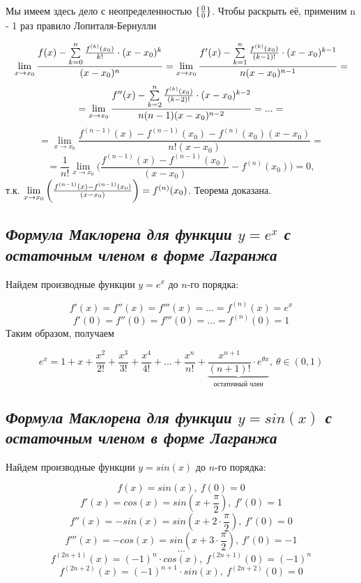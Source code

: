 Мы имеем здесь дело с неопределенностью ${\large\{\frac{0}{0}\}}$. Чтобы раскрыть её, применим n - 1 раз правило Лопиталя-Бернулли

$$\lim\limits_{x \rightarrow x_0}{\frac{f(x) -\sum\limits_{k=0}^n{\Large\frac{f^{(k)}(x_0)}{k!}}\cdot (x - x_0)^k}{(x - x_0)^n}} 
= \lim\limits_{x \rightarrow x_0}\frac{f'(x) -\sum\limits_{k=1}^n{\Large\frac{f^{(k)}(x_0)}{(k-1)!}}\cdot (x - x_0)^{k-1}}{n(x - x_0)^{n-1}} 
=$$ $$= \lim\limits_{x \rightarrow x_0}{\frac{f''(x) -\sum\limits_{k=2}^n{\Large\frac{f^{(k)}(x_0)}{(k-2)!}}\cdot (x - x_0)^{k-2}}{n(n-1)(x - x_0)^{n-2}}} 
= ...=$$ $$
=\lim\limits_{x \rightarrow x_0}{\frac{f^{(n-1)}(x)-f^{(n-1)}(x_0) - f^{(n)}(x_0)(x - x_0)}{n!(x - x_0)}} 
=$$ $$= \frac{1}{n!}\lim\limits_{x \rightarrow x_0}\bigg({\frac{f^{(n-1)}(x)-f^{(n-1)}(x_0)}{(x - x_0)}}- f^{(n)}(x_0)\bigg)=0,$$ т.к. $\lim\limits_{x \rightarrow x_0}\bigg({\Large\frac{f^{(n-1)}(x)-f^{(n-1)}(x_0)}{(x - x_0)}}\bigg)=f^{(n)}(x_0)$. Теорема доказана.
\newpage 
\subsection{\textit{Формула Маклорена для функции $y = e^x$ с остаточным членом в форме Лагранжа}}

Найдем производные функции $y = e^x$ до $n$-го порядка:

$$f'(x) = f''(x) = f'''(x) =...=f^{(n)}(x) = e^x$$ $$f'(0) = f''(0) = f'''(0) =...=f^{(n)}(0) = 1$$ Таким образом, получаем
\begin{mainQuote}

$$e^x = 1 + x + \frac{x^2}{2!}+ \frac{x^3}{3!}+ \frac{x^4}{4!} + ... + \frac{x^n}{n!} + \underbrace{\frac{x^{n + 1}}{(n+1)!}\cdot e^{\theta x}}_{\text{остаточный\ член}}, \ \theta \in (0, 1)$$
\end{mainQuote}
\newpage 
\subsection{\textit{Формула Маклорена для функции $y = sin(x)$ с остаточным членом в форме Лагранжа}}

Найдем производные функции $y = sin(x)$ до $n$-го порядка:

$$f(x) = sin(x), \ f(0) = 0$$ $$f'(x) = cos(x) = sin(x + \frac{\pi}{2}), \ f'(0)=1$$ $$f''(x) = -sin(x) = sin(x + 2\cdot \frac{\pi}{2}), \ f'(0)=0$$ $$f'''(x) = -cos(x) = sin(x + 3\cdot \frac{\pi}{2}), \ f'(0) = -1$$ $$\dots$$ $$f^{(2n + 1)}(x) = (-1)^{n}\cdot cos(x), \ f^{(2n + 1)}(0) = (-1)^{n}$$ $$f^{(2n + 2)}(x) = (-1)^{n+1}\cdot sin(x), \ f^{(2n + 2)}(0) = 0$$

